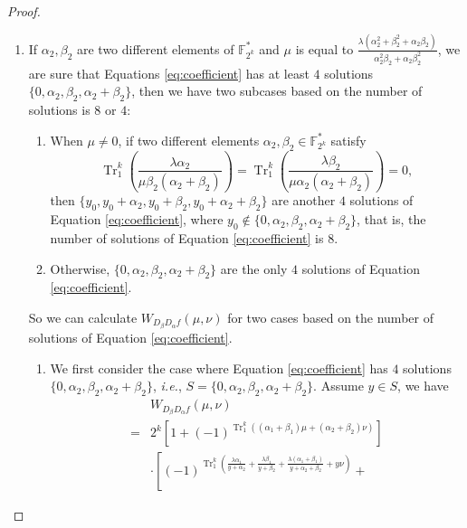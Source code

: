 \documentclass{article}
\newcommand{\F}{\mathbb{F}}
\newcommand{\0}{\textbf{0}}
\newcommand{\1}{\textbf{1}}
\newcommand{\TRACE}{\operatorname{Tr}_1^k}
\theoremstyle{plain}
\begin{document}
\begin{proof}
\begin{enumerate}[label=\textbf{Case \arabic*},wide = 0pt]
            \item If $\alpha_2,\beta_2$ are two different elements of $\F_{2^k}^*$ and $\mu$ is equal to $\frac{\lambda(\alpha_2^2+\beta_2^2+\alpha_2\beta_2)}{\alpha_2^2\beta_2+\alpha_2\beta_2^2}$,
            we are sure that Equations \eqref{eq:coefficient} has at least $4$ solutions $\{0,\alpha_2,\beta_2,\alpha_2+\beta_2\}$, then we have two subcases based on the number of solutions is $8$ or $4$:
            \begin{enumerate}[label=(\arabic{*})]
                \item When $\mu\ne 0$, if two different elements $\alpha_2,\beta_2\in\F_{2^k}^*$ satisfy 
                \begin{equation}\label{eq:last_four_solution_condition}
                    \TRACE\left(\frac{\lambda\alpha_2}{\mu\beta_2(\alpha_2+\beta_2)}\right)=\TRACE\left(\frac{\lambda\beta_2}{\mu\alpha_2(\alpha_2+\beta_2)}\right)=0,
                \end{equation}
                then $\{y_0,y_0+\alpha_2,y_0+\beta_2,y_0+\alpha_2+\beta_2\}$ are another $4$ solutions of Equation \eqref{eq:coefficient}, where $y_0\notin\{0,\alpha_2,\beta_2,\alpha_2+\beta_2\}$, that is, the number of solutions of Equation \eqref{eq:coefficient} is $8$.
                \item Otherwise, $\{0,\alpha_2,\beta_2,\alpha_2+\beta_2\}$ are the only $4$ solutions of Equation \eqref{eq:coefficient}.
            \end{enumerate}
            So we can calculate $W_{D_{\beta}D_{\alpha}f}(\mu,\nu)$ for two cases based on the number of solutions of Equation \eqref{eq:coefficient}.
            \begin{enumerate}[label=\textbf{Subcase \Alph{*}},itemindent=*,wide=\parindent]
                \item We first consider the case where Equation \eqref{eq:coefficient} has $4$ solutions
                $\{0,\alpha_2,\beta_2,\alpha_2+\beta_2\}$, \emph{i.e.}, $S=\{0,\alpha_2,\beta_2,\alpha_2+\beta_2\}$.
                Assume $y\in S$, we have
                \begin{align}\label{eq:simpleforms_4}
                    &W_{D_{\beta}D_{\alpha}f}(\mu,\nu)\nonumber\\
                    =&2^k\left[1+(-1)^{\TRACE\left((\alpha_1+\beta_1)\mu+ (\alpha_2+\beta_2)\nu\right)}\right]\nonumber\\
                    &\cdot
                    \left[(-1)^{\TRACE\left(\frac{\lambda\alpha_1}{y+\alpha_2}+\frac{\lambda\beta_1}{y+\beta_2}+\frac{\lambda(\alpha_1+\beta_1)}{y+\alpha_2+\beta_2}+ y\nu\right)}+

\end{align}
\end{enumerate}
\end{enumerate}
\end{proof}
\end{document}
